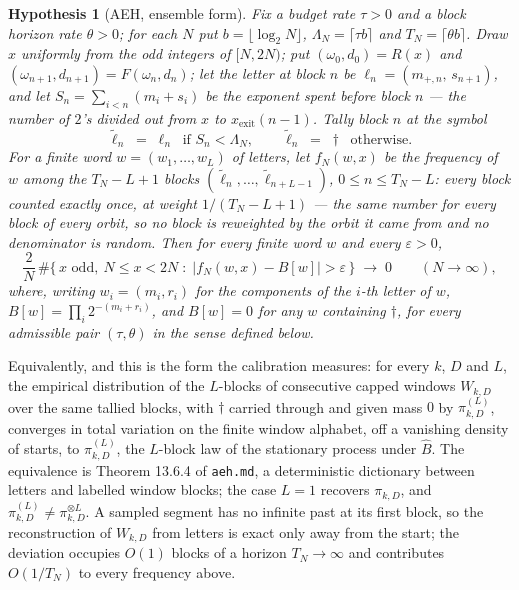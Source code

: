 \documentclass[11pt]{article}
\newtheorem{hypothesis}[theorem]{Hypothesis}
\theoremstyle{remark}
\newcommand{\w}{\omega}
\begin{document}
\begin{hypothesis}[AEH, ensemble form]\label{hyp:aeh}
Fix a \emph{budget rate} $\tau > 0$ and a \emph{block horizon rate} $\theta > 0$;
for each $N$ put $b = \lfloor\log_2 N\rfloor$, $\Lambda_N = \lceil \tau b\rceil$
and $T_N = \lceil \theta b\rceil$. Draw $x$ uniformly from the odd integers of
$[N, 2N)$; put $(\w_0,d_0) = R(x)$ and $(\w_{n+1},d_{n+1}) = F(\w_n,d_n)$; let the
\emph{letter} at block $n$ be $\ell_n = (m_{+,n},\,s_{n+1})$, and let
$S_n = \sum_{i<n}(m_i + s_i)$ be the \emph{exponent spent} before block $n$ ---
the number of $2$'s divided out from $x$ to $x_{\mathrm{exit}}(n-1)$. Tally block
$n$ at the symbol
\[
  \tilde\ell_n \;=\; \ell_n \ \text{ if } S_n < \Lambda_N, \qquad
  \tilde\ell_n \;=\; \dagger \ \text{ otherwise.}
\]
For a finite word $w = (w_1,\dots,w_L)$ of letters, let $f_N(w,x)$ be the
frequency of $w$ among the $T_N - L + 1$ blocks
$(\tilde\ell_n,\dots,\tilde\ell_{n+L-1})$, $0 \le n \le T_N - L$: every
block counted exactly once, at weight $1/(T_N-L+1)$ --- the same number for
every block of every orbit, so no block is reweighted by the orbit it came from
and no denominator is random. Then for every finite word $w$ and every
$\varepsilon > 0$,
\[
  \frac{2}{N}\,\#\bigl\{\, x \text{ odd},\ N \le x < 2N \;:\;
  \bigl| f_N(w,x) - B[w] \bigr| > \varepsilon \,\bigr\}
  \;\longrightarrow\; 0 \qquad (N \to \infty),
\]
where, writing $w_i = (m_i, r_i)$ for the components of the $i$-th letter of $w$,
$B[w] = \prod_{i} 2^{-(m_i + r_i)}$, and $B[w] = 0$ for any $w$ containing
$\dagger$, for every admissible pair $(\tau,\theta)$ in the sense defined below.
\end{hypothesis}

Equivalently, and this is the form the calibration measures: for every $k$, $D$
and $L$, the empirical distribution of the $L$-blocks of consecutive capped
windows $W_{k,D}$ over the same tallied blocks, with $\dagger$ carried through
and given mass $0$ by $\pi^{(L)}_{k,D}$, converges in total variation on the
finite window alphabet, off a vanishing density of starts, to
$\pi^{(L)}_{k,D}$, the $L$-block law of the stationary process under $\hat B$.
The equivalence is Theorem 13.6.4 of \texttt{aeh.md}, a deterministic dictionary
between letters and labelled window blocks; the case $L = 1$ recovers
$\pi_{k,D}$, and $\pi^{(L)}_{k,D} \neq \pi_{k,D}^{\otimes L}$. A sampled segment
has no infinite past at its first block, so the reconstruction of
$W_{k,D}$ from letters is exact only away from the start; the
deviation occupies $O(1)$ blocks of a horizon $T_N \to \infty$ and contributes
$O(1/T_N)$ to every frequency above.
\end{document}
